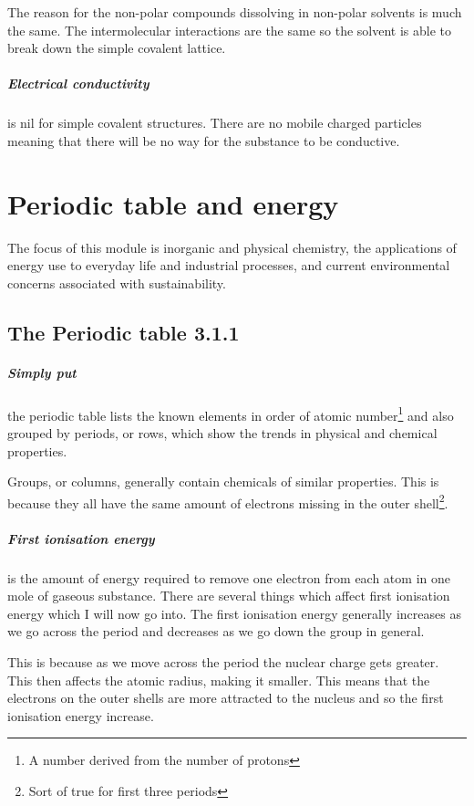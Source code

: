 \documentclass[11pt,a4paper]{memoir}
\begin{document}
	The reason for the non-polar compounds dissolving in non-polar solvents is much the same. The intermolecular interactions are the same so the solvent is able to break down the simple covalent lattice.
	
	\paragraph{Electrical conductivity} is nil for simple covalent structures. There are no mobile charged particles meaning that there will be no way for the substance to be conductive.
	
\chapter{Periodic table and energy}
	The focus of this module is inorganic and physical chemistry, the applications of energy use to everyday life and industrial processes, and current environmental concerns associated with sustainability. 

\section{The Periodic table 3.1.1}
	
	\paragraph{Simply put} the periodic table lists the known elements in order of atomic number\footnote{A number derived from the number of protons} and also grouped by periods, or rows, which show the trends in physical and chemical properties.
	
	Groups, or columns, generally contain chemicals of similar properties. This is because they all have the same amount of electrons missing in the outer shell\footnote{Sort of true for first three periods}.
	
	\paragraph{First ionisation energy} is the amount of energy required to remove one electron from each atom in one mole of gaseous substance. There are several things which affect first ionisation energy which I will now go into.
	The first ionisation energy generally increases as we go across the period and decreases as we go down the group in general. 
	
	This is because as we move across the period the nuclear charge gets greater. This then affects the atomic radius, making it smaller.  This means that the electrons on the outer shells are more attracted to the nucleus and so the first ionisation energy increase.
	
\end{document}
